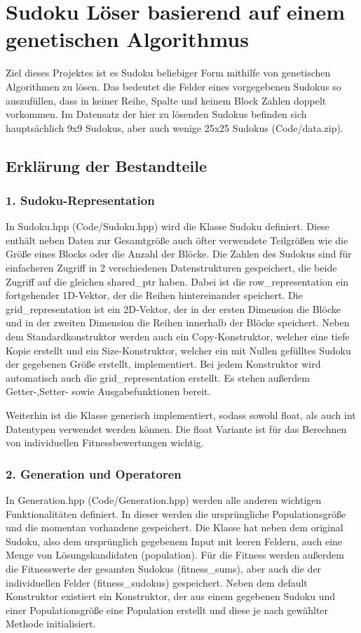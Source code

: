 \section*{Sudoku Löser basierend auf einem genetischen Algorithmus}
Ziel dieses Projektes ist es Sudoku beliebiger Form mithilfe von genetischen Algorithmen zu lösen.
Das bedeutet die Felder eines vorgegebenen Sudokus so auszufüllen, dass in keiner Reihe, Spalte und keinem Block Zahlen doppelt vorkommen. 
Im Datensatz der hier zu lösenden Sudokus befinden sich hauptsächlich 9x9 Sudokus, aber auch wenige 25x25 Sudokus (Code/data.zip).

\subsection*{Erklärung der Bestandteile}
\subsubsection*{1. Sudoku-Representation}

In Sudoku.hpp (Code/Sudoku.hpp) wird die Klasse Sudoku definiert. Diese enthält neben Daten zur Gesamtgröße auch öfter verwendete Teilgrößen wie die Größe eines Blocks oder die Anzahl der Blöcke. Die Zahlen des Sudokus sind für einfacheren Zugriff in 2 verschiedenen Datenstrukturen gespeichert, die beide Zugriff auf 
die gleichen shared\_ptr haben. Dabei ist die row\_representation ein fortgehender 1D-Vektor, der die Reihen hintereinander speichert. Die grid\_representation
ist ein 2D-Vektor, der in der ersten Dimension die Blöcke und in der zweiten Dimension die Reihen innerhalb der Blöcke speichert. Neben dem Standardkonstruktor werden auch ein Copy-Konstruktor, welcher eine tiefe Kopie erstellt und ein Size-Konstruktor, welcher ein mit Nullen gefülltes Sudoku der gegebenen Größe erstellt, implementiert. Bei jedem Konstruktor wird automatisch auch die grid\_representation erstellt.
Es stehen außerdem Getter-,Setter- sowie Ausgabefunktionen bereit.

\noindent Weiterhin ist die Klasse generisch implementiert, sodass sowohl float, als auch int Datentypen verwendet werden können. Die float Variante ist für das Berechnen von individuellen Fitnessbewertungen wichtig.

\subsubsection*{2. Generation und Operatoren}

In Generation.hpp (Code/Generation.hpp) werden alle anderen wichtigen Funktionalitäten definiert. In dieser werden die ursprüngliche Populationsgröße und die momentan vorhandene gespeichert. Die Klasse hat neben dem original Sudoku, also dem ursprünglich gegebenem Input mit leeren Feldern, auch eine Menge von Lösungskandidaten (population). Für die Fitness werden außerdem die Fitnesswerte der gesamten Sudokus (fitness\_sums), aber auch die der individuellen Felder (fitness\_sudokus) gespeichert. Neben dem default Konstruktor existiert ein Konstruktor, der aus einem gegebenen Sudoku und einer Populationsgröße eine Population erstellt und diese je nach gewählter Methode initialisiert.

